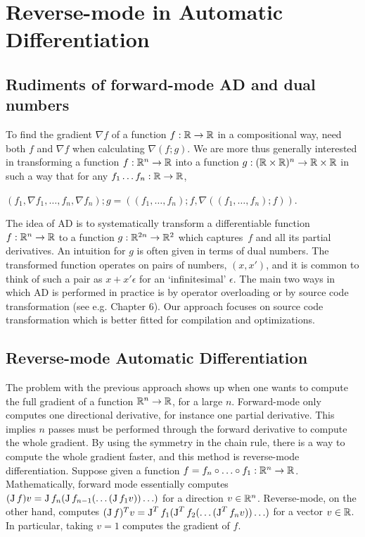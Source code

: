 \section{Reverse-mode in Automatic Differentiation}
\label{sec:background}

\subsection{Rudiments of forward-mode AD and dual numbers}

To find the gradient $\nabla f$ of a function $f:\mathbb{R}\to \mathbb{R}$ in a compositional way, need both $f$ and $\nabla f$ when calculating $\nabla (f;g)$.
We are more thus generally interested in transforming a function $f:\mathbb{R}^n\to \mathbb{R}$ into a function
$g:(\mathbb{R}\times \mathbb{R})^n\to \mathbb{R}\times \mathbb{R}$ in such a way that for any
$f_1\dots f_n:\mathbb{R}\to\mathbb{R}$, 
\begin{center}
    $(f_1,\nabla f_1,\dots, f_n,\nabla f_n);g = ((f_1,\dots, f_n);f,\nabla ((f_1, \dots, f_n);f))$.
\end{center}

The idea of AD is to systematically transform a differentiable function $f:\mathbb{R}^n\to \mathbb{R}$ to a function $g:\mathbb{R}^{2n}\to \mathbb{R}^2$ which captures~$f$ and all its partial derivatives.
An intuition for $g$ is often given in terms of dual numbers. The transformed function operates on pairs of numbers, $(x,x')$, and it is common
to think of such a pair as $x+x'\epsilon$ for an `infinitesimal' $\epsilon$. The main two ways in which AD is performed in practice is by operator overloading or by source code transformation (see e.g. \cite{griewank2008evaluating} Chapter 6). 
Our approach focuses on source code transformation which is better fitted for compilation and optimizations.

\subsection{Reverse-mode Automatic Differentiation}

The problem with the previous approach shows up when one wants to compute the full gradient of a function $\mathbb{R}^n\to\mathbb{R}$, for a large $n$. 
Forward-mode only computes one directional derivative, for instance one partial derivative. 
This implies $n$ passes must be performed through the forward derivative to compute the whole gradient.
By using the symmetry in the chain rule, there is a way to compute the whole gradient faster, and this method is reverse-mode differentiation.
Suppose given a function $f=f_n\circ\ldots\circ f_1 :\mathbb{R}^n\to\mathbb{R}$. 
Mathematically, forward mode essentially computes $(\operatorname{J} f)v=\operatorname{J} f_n(\operatorname{J} f_{n-1}(\ldots(\operatorname{J} f_1v))\ldots)$ for a direction $v\in\mathbb{R}^n$. 
Reverse-mode, on the other hand, computes $(\operatorname{J} f)^Tv = \operatorname{J}^Tf_1(\operatorname{J}^T f_{2}(\ldots(\operatorname{J}^T f_nv))\ldots)$ for a vector $v\in\mathbb{R}$.
In particular, taking $v=1$ computes the gradient of $f$.

